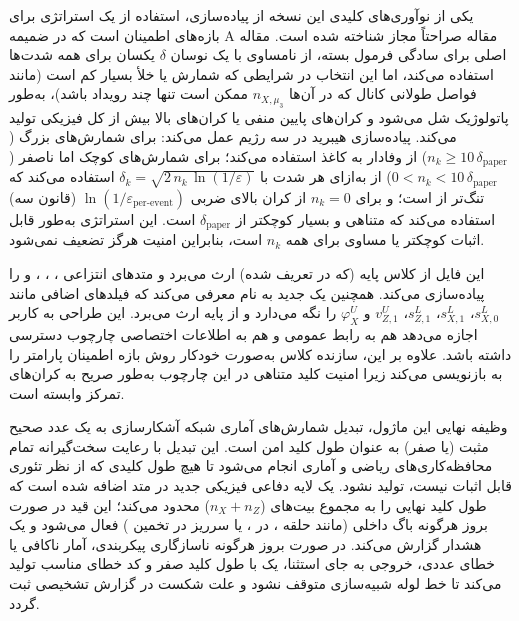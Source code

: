 یکی از نوآوری‌های کلیدی این نسخه از پیاده‌سازی، استفاده از یک استراتژی  برای بازه‌های اطمینان است که در ضمیمه A مقاله صراحتاً مجاز شناخته شده است. مقاله اصلی برای سادگی فرمول بسته، از نامساوی  با یک نوسان $\delta$ یکسان برای همه شدت‌ها استفاده می‌کند، اما این انتخاب در شرایطی که شمارش  یا خلأ بسیار کم است (مانند فواصل طولانی کانال که در آن‌ها $n_{X,\mu_3}$ ممکن است تنها چند رویداد باشد)، به‌طور پاتولوژیک شل می‌شود و کران‌های پایین منفی یا کران‌های بالا بیش از کل فیزیکی تولید می‌کند. پیاده‌سازی هیبرید در سه رژیم عمل می‌کند: برای شمارش‌های بزرگ ($n_k \ge 10\,\delta_{\text{paper}}$) از  وفادار به کاغذ استفاده می‌کند؛ برای شمارش‌های کوچک اما ناصفر ($0 < n_k < 10\,\delta_{\text{paper}}$) از  به‌ازای هر شدت با $\delta_k = \sqrt{2\,n_k\,\ln(1/\varepsilon)}$ استفاده می‌کند که تنگ‌تر از  است؛ و برای $n_k = 0$ از کران بالای  ضربی $\ln(1/\varepsilon_{\text{per-event}})$ (قانون سه) استفاده می‌کند که متناهی و بسیار کوچکتر از $\delta_{\text{paper}}$ است. این استراتژی به‌طور قابل اثبات کوچکتر یا مساوی  برای همه $n_k$ است، بنابراین امنیت هرگز تضعیف نمی‌شود.

این فایل از کلاس پایه  (که در  تعریف شده) ارث می‌برد و متدهای انتزاعی ، ، ،  و  را پیاده‌سازی می‌کند. همچنین یک  جدید به نام  معرفی می‌کند که فیلدهای اضافی مانند $s_{X,0}^L$، $s_{X,1}^L$، $s_{Z,1}^L$، $v_{Z,1}^U$ و $\varphi_X^U$ را نگه می‌دارد و از  پایه ارث می‌برد. این طراحی به کاربر اجازه می‌دهد هم به رابط عمومی  و هم به اطلاعات اختصاصی چارچوب  دسترسی داشته باشد. علاوه بر این، سازنده کلاس  به‌صورت خودکار روش بازه اطمینان پارامتر  را به  بازنویسی می‌کند زیرا امنیت کلید متناهی در این چارچوب به‌طور صریح به کران‌های تمرکز  وابسته است.

وظیفه نهایی این ماژول، تبدیل شمارش‌های آماری شبکه آشکارسازی به یک عدد صحیح مثبت (یا صفر) به عنوان طول کلید امن است. این تبدیل با رعایت سخت‌گیرانه تمام محافظه‌کاری‌های ریاضی و آماری انجام می‌شود تا هیچ طول کلیدی که از نظر تئوری قابل اثبات نیست، تولید نشود. یک لایه دفاعی فیزیکی جدید در متد  اضافه شده است که طول کلید نهایی را به مجموع بیت‌های  ($n_X + n_Z$) محدود می‌کند؛ این قید در صورت بروز هرگونه باگ داخلی (مانند حلقه ،  در ، یا سرریز در تخمین ) فعال می‌شود و یک هشدار گزارش می‌کند. در صورت بروز هرگونه ناسازگاری پیکربندی، آمار ناکافی یا خطای عددی، خروجی به جای استثنا، یک  با طول کلید صفر و کد خطای مناسب تولید می‌کند تا خط لوله شبیه‌سازی متوقف نشود و علت شکست در گزارش تشخیصی ثبت گردد.

